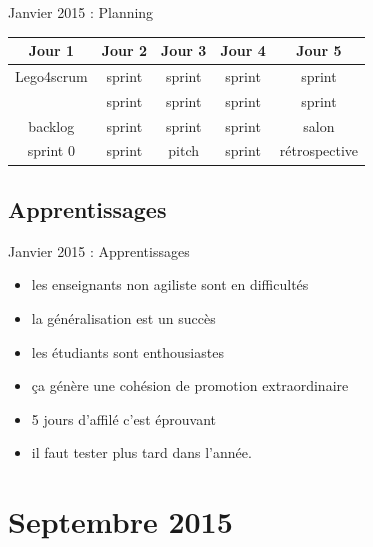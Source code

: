 \documentclass{beamer}
\begin{document}
\begin{frame}{Janvier 2015 : Planning}
  \begin{center}
    \begin{tabular}{| c | c | c | c | c |}
      \hline
      \textbf{Jour 1} & \textbf{Jour 2} & \textbf{Jour 3} & \textbf{Jour 4} & \textbf{Jour 5} \\
      \hline \hline
      Lego4scrum      & sprint          & sprint          & sprint          & sprint          \\
      \hline
                      & sprint          & sprint          & sprint          & sprint          \\
      \hline \hline
      backlog         & sprint          & sprint          & sprint          & salon           \\
      \hline
      sprint 0        & sprint          & pitch           & sprint          & rétrospective   \\
      \hline
    \end{tabular}
  \end{center}
\end{frame}

\subsection{Apprentissages}
\begin{frame}{Janvier 2015 : Apprentissages}
  \begin{itemize}
    \item les enseignants non agiliste sont en difficultés
    \item la généralisation est un succès
    \item les étudiants sont enthousiastes
    \item ça génère une cohésion de promotion extraordinaire
    \item 5 jours d'affilé c'est éprouvant
    \item il faut tester plus tard dans l'année.
  \end{itemize}
\end{frame}

\section{Septembre 2015}
\end{document}
